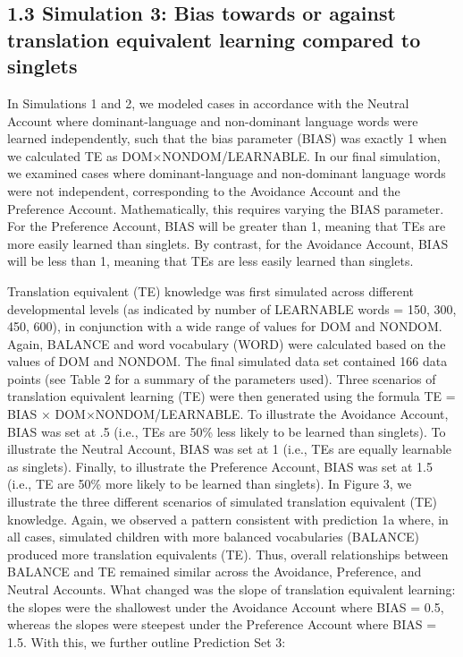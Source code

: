 \documentclass[
  english,
  ,man,floatsintext]{apa6}
\begin{document}
\hypertarget{simulation-3-bias-towards-or-against-translation-equivalent-learning-compared-to-singlets}{%
\subsection{1.3 Simulation 3: Bias towards or against translation equivalent learning compared to singlets}\label{simulation-3-bias-towards-or-against-translation-equivalent-learning-compared-to-singlets}}

In Simulations 1 and 2, we modeled cases in accordance with the Neutral Account where dominant-language and non-dominant language words were learned independently, such that the bias parameter (BIAS) was exactly 1 when we calculated TE as DOM×NONDOM/LEARNABLE. In our final simulation, we examined cases where dominant-language and non-dominant language words were not independent, corresponding to the Avoidance Account and the Preference Account. Mathematically, this requires varying the BIAS parameter. For the Preference Account, BIAS will be greater than 1, meaning that TEs are more easily learned than singlets. By contrast, for the Avoidance Account, BIAS will be less than 1, meaning that TEs are less easily learned than singlets.

Translation equivalent (TE) knowledge was first simulated across different developmental levels (as indicated by number of LEARNABLE words = 150, 300, 450, 600), in conjunction with a wide range of values for DOM and NONDOM. Again, BALANCE and word vocabulary (WORD) were calculated based on the values of DOM and NONDOM. The final simulated data set contained 166 data points (see Table 2 for a summary of the parameters used). Three scenarios of translation equivalent learning (TE) were then generated using the formula TE = BIAS × DOM×NONDOM/LEARNABLE. To illustrate the Avoidance Account, BIAS was set at .5 (i.e., TEs are 50\% less likely to be learned than singlets). To illustrate the Neutral Account, BIAS was set at 1 (i.e., TEs are equally learnable as singlets). Finally, to illustrate the Preference Account, BIAS was set at 1.5 (i.e., TE are 50\% more likely to be learned than singlets). In Figure 3, we illustrate the three different scenarios of simulated translation equivalent (TE) knowledge. Again, we observed a pattern consistent with prediction 1a where, in all cases, simulated children with more balanced vocabularies (BALANCE) produced more translation equivalents (TE). Thus, overall relationships between BALANCE and TE remained similar across the Avoidance, Preference, and Neutral Accounts. What changed was the slope of translation equivalent learning: the slopes were the shallowest under the Avoidance Account where BIAS = 0.5, whereas the slopes were steepest under the Preference Account where BIAS = 1.5. With this, we further outline Prediction Set 3:
\end{document}
